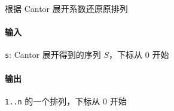根据 Cantor 展开系数还原原排列

\paragraph{输入}

\verb|s|: Cantor 展开得到的序列 \(S\)，下标从 \(0\) 开始

\paragraph{输出}

\verb|1..n| 的一个排列，下标从 \(0\) 开始
